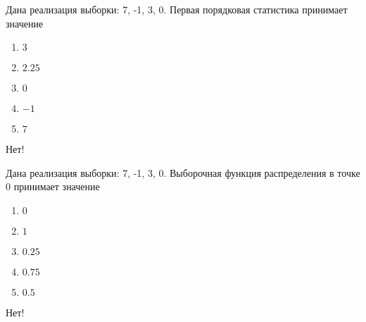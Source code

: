 \documentclass[t]{beamer}
\begin{document}
 \begin{frame} \label{44-No} 
\begin{block}{44} 

Дана реализация выборки: 7, -1, 3, 0. Первая порядковая статистика принимает значение


 \end{block} 
\begin{enumerate} 
\item[] \hyperlink{44-No}{\beamergotobutton{} $3$}
\item[] \hyperlink{44-No}{\beamergotobutton{} $2.25$}
\item[] \hyperlink{44-No}{\beamergotobutton{} $0$}
\item[] \hyperlink{44-Yes}{\beamergotobutton{} $-1$}
\item[] \hyperlink{44-No}{\beamergotobutton{} $7$}
\end{enumerate} 

 \alert{Нет!} 
\end{frame} 


 \begin{frame} \label{45-No} 
\begin{block}{45} 

Дана реализация выборки: 7, -1, 3, 0.  Выборочная функция распределения в точке 0 принимает значение


 \end{block} 
\begin{enumerate} 
\item[] \hyperlink{45-No}{\beamergotobutton{} $0$}
\item[] \hyperlink{45-No}{\beamergotobutton{} $1$}
\item[] \hyperlink{45-No}{\beamergotobutton{} $0.25$}
\item[] \hyperlink{45-No}{\beamergotobutton{} $0.75$}
\item[] \hyperlink{45-Yes}{\beamergotobutton{} $0.5$}
\end{enumerate} 

 \alert{Нет!} 
\end{frame} 
\end{document}
